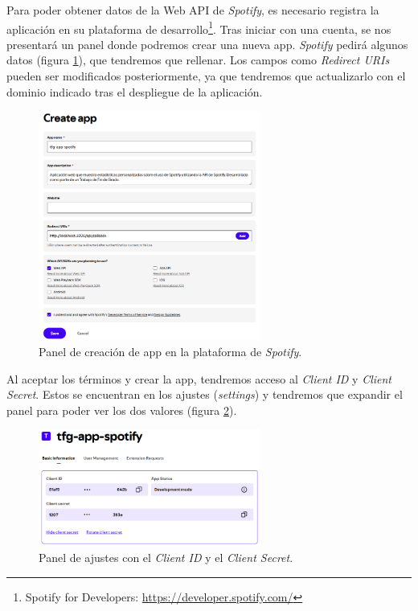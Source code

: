 Para poder obtener datos de la Web API de \textit{Spotify}, es necesario registra la aplicación en su plataforma de desarrollo\footnote{Spotify for Developers: \href{https://developer.spotify.com/}{https://developer.spotify.com/}}. Tras iniciar con una cuenta, se nos presentará un panel donde podremos crear una nueva app. \textit{Spotify} pedirá algunos datos (figura \ref{fig:create_app}), que tendremos que rellenar. Los campos como \textit{Redirect URIs} pueden ser modificados posteriormente, ya que tendremos que actualizarlo con el dominio indicado tras el despliegue de la aplicación.

\begin{figure}[H]
    \centering
    \includegraphics[width=0.65\textwidth]{figures/registro_spotify/create_app.png}
    \caption{Panel de creación de app en la plataforma de \textit{Spotify}.}
    \label{fig:create_app}
\end{figure}

Al aceptar los términos y crear la app, tendremos acceso al \textit{Client ID} y \textit{Client Secret}. Estos se encuentran en los ajustes (\textit{settings}) y tendremos que expandir el panel para poder ver los dos valores (figura \ref{fig:client_id_secret}).

\begin{figure}[H]
    \centering
    \includegraphics[width=0.65\textwidth]{figures/registro_spotify/client_id_secret.png}
    \caption{Panel de ajustes con el \textit{Client ID} y el \textit{Client Secret}.}
    \label{fig:client_id_secret}
\end{figure}

